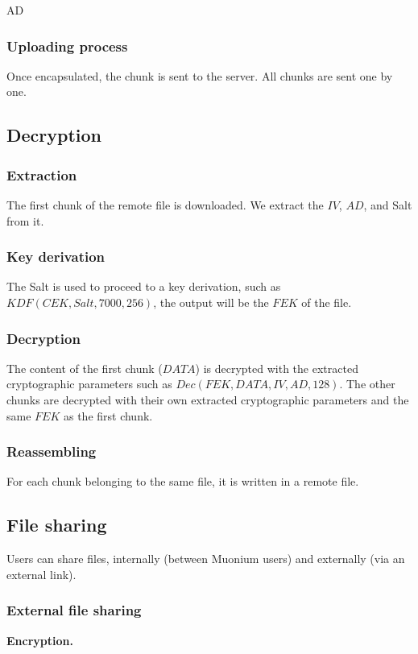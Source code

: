 AD\documentclass[a4paper,10pt]{article}
\begin{document}
\subsubsection{Uploading process}
Once encapsulated, the chunk is sent to the server. All chunks are sent one by one.



\subsection{Decryption}
\subsubsection{Extraction}
The first chunk of the remote file is downloaded. We extract the $IV$, $AD$, and Salt from it.

\subsubsection{Key derivation}
The Salt is used to proceed to a key derivation, such as $KDF(CEK, Salt, 7000, 256)$, the output will be the $FEK$ of the file.

\subsubsection{Decryption}
The content of the first chunk ($DATA$) is decrypted with the extracted cryptographic parameters such as $Dec(FEK,DATA,IV,AD,128)$. The other chunks are decrypted with their own extracted cryptographic parameters and the same $FEK$ as the first chunk.

\subsubsection{Reassembling}
For each chunk belonging to the same file, it is written in a remote file.
\medskip

\subsection{File sharing}
Users can share files, internally (between Muonium users) and externally (via an external link).

\subsubsection{External file sharing}

\textbf{Encryption.}
\end{document}
